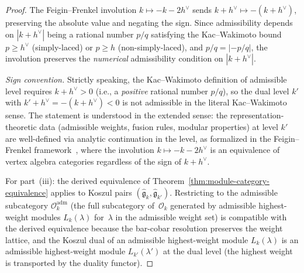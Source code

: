 \begin{proof}
The Feigin--Frenkel involution $k \mapsto -k-2h^\vee$ sends
$k + h^\vee \mapsto -(k+h^\vee)$, preserving the absolute value and
negating the sign.  Since admissibility depends on $|k+h^\vee|$ being
a rational number $p/q$ satisfying the Kac--Wakimoto bound
$p \geq h^\vee$ (simply-laced) or $p \geq h$ (non-simply-laced),
and $p/q = |-p/q|$, the involution preserves the \emph{numerical}
admissibility condition on $|k+h^\vee|$.

\emph{Sign convention.}
Strictly speaking, the Kac--Wakimoto definition of admissible level
requires $k + h^\vee > 0$ (i.e., a \emph{positive} rational number $p/q$),
so the dual level $k'$ with $k' + h^\vee = -(k+h^\vee) < 0$ is not
admissible in the literal Kac--Wakimoto sense.  The statement is
understood in the extended sense: the representation-theoretic data
(admissible weights, fusion rules, modular properties) at level $k'$
are well-defined via analytic continuation in the level, as formalized
in the Feigin--Frenkel framework~\cite{Feigin-Frenkel}, where the involution
$k \mapsto -k-2h^\vee$ is an equivalence of vertex algebra categories
regardless of the sign of $k + h^\vee$.

For part~(iii): the derived equivalence of
Theorem~\ref{thm:module-category-equivalence} applies to Koszul pairs
$(\widehat{\mathfrak{g}}_k, \widehat{\mathfrak{g}}_{k'})$.
Restricting to the admissible subcategory
$\mathcal{O}_k^{\mathrm{adm}}$
(the full subcategory of~$\mathcal{O}_k$ generated by
admissible highest-weight modules $L_k(\lambda)$
for~$\lambda$ in the admissible weight set)
is compatible with the derived equivalence because the bar-cobar
resolution preserves the weight lattice, and the Koszul dual of
an admissible highest-weight module $L_k(\lambda)$ is an admissible
highest-weight module $L_{k'}(\lambda')$ at the dual level
(the highest weight is transported by the duality functor).
\end{proof}

